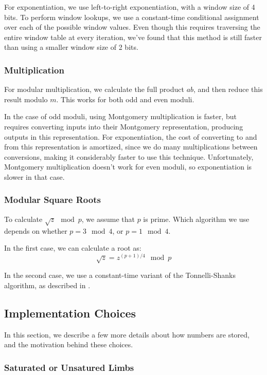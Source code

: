 \documentclass[11pt, a4paper]{article} %
\begin{document}
{For exponentiation, we use left-to-right exponentiation,
with a window size of 4 bits. To perform window lookups,
we use a constant-time conditional assignment
over each of the possible window values. Even though this requires traversing
the entire window table at every iteration, we've found that this method
is still faster than using a smaller window size of 2 bits.

\subsubsection{Multiplication}

For modular multiplication, we calculate the full product
$ab$, and then reduce this result modulo $m$. This works
for both odd and even moduli.

In the case of odd moduli, using Montgomery multiplication
\cite{kaya_koc_analyzing_1996-1, pornin_bearssl_2020-1} is
faster, but requires converting inputs into their Montgomery
representation, producing outputs in this representation.
For exponentiation,
the cost of converting to and from this representation is amortized,
since we do many multiplications between conversions, making
it considerably faster to use this technique. Unfortunately,
Montgomery multiplication doesn't work for even moduli,
so exponentiation is slower in that case.

\subsubsection{Modular Square Roots}

To calculate $\sqrt{z} \mod p$, we assume that $p$ is prime.
Which algorithm we use depends on whether $p = 3 \mod 4$,
or $p = 1 \mod 4$.

In the first case, we can calculate a root as:
$$
\sqrt{z} = z^{(p + 1) / 4} \mod p
$$

In the second case, we use a constant-time variant
of the Tonnelli-Shanks algorithm, as described in 
\cite{wahby_hashing_nodate}.

\subsection{Implementation Choices}

In this section, we describe a few more details
about how numbers are stored, and the motivation behind
these choices.

\subsubsection{Saturated or Unsatured Limbs}

}
\end{document}
